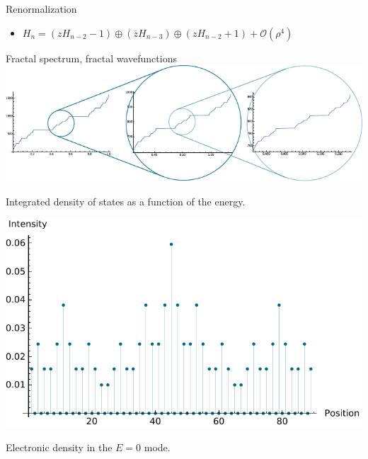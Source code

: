 \documentclass[xcolor=x11names,compress,professionalfonts]{beamer}
\renewcommand{\(}{\begin{columns}}
\renewcommand{\)}{\end{columns}}
\newcommand{\<}[1]{\begin{column}{#1}}
\renewcommand{\>}{\end{column}}
\newcommand{\zb}{\ensuremath{\overline{z}}}
\begin{document}
\begin{frame}{Renormalization}
\begin{itemize}
		
		\item $ H_n = \left( z H_{n-2} - 1 \right) \oplus \left( \zb H_{n-3} \right) \oplus \left( z H_{n-2} + 1 \right) + \mathcal{O}(\rho^4) $
	\end{itemize}
    
\end{frame}

\begin{frame}{Fractal spectrum, fractal wavefunctions}
    \centering
    	\includegraphics[scale=.8]{idos.pdf}
    	
    	\scriptsize
    	Integrated density of states as a function of the energy.
    	
    	\includegraphics[scale=.45]{amplitude_wf.pdf}
    	
    	\scriptsize 
    	Electronic density in the $E=0$ mode.
     
\end{frame}
\end{document}
